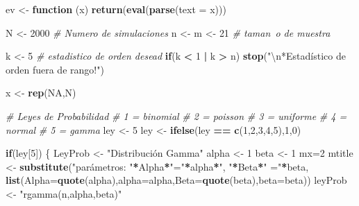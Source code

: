 \documentclass[]{book}
\newenvironment{Shaded}{\begin{snugshade}}{\end{snugshade}}
\newcommand{\CharTok}[1]{\textcolor[rgb]{0.31,0.60,0.02}{#1}}
\newcommand{\CommentTok}[1]{\textcolor[rgb]{0.56,0.35,0.01}{\textit{#1}}}
\newcommand{\ControlFlowTok}[1]{\textcolor[rgb]{0.13,0.29,0.53}{\textbf{#1}}}
\newcommand{\DataTypeTok}[1]{\textcolor[rgb]{0.13,0.29,0.53}{#1}}
\newcommand{\DecValTok}[1]{\textcolor[rgb]{0.00,0.00,0.81}{#1}}
\newcommand{\KeywordTok}[1]{\textcolor[rgb]{0.13,0.29,0.53}{\textbf{#1}}}
\newcommand{\NormalTok}[1]{#1}
\newcommand{\OperatorTok}[1]{\textcolor[rgb]{0.81,0.36,0.00}{\textbf{#1}}}
\newcommand{\OtherTok}[1]{\textcolor[rgb]{0.56,0.35,0.01}{#1}}
\newcommand{\StringTok}[1]{\textcolor[rgb]{0.31,0.60,0.02}{#1}}
\begin{document}
\begin{Shaded}
\begin{Highlighting}[]
\NormalTok{ev <-}\StringTok{ }\ControlFlowTok{function}\NormalTok{ (x) }\KeywordTok{return}\NormalTok{(}\KeywordTok{eval}\NormalTok{(}\KeywordTok{parse}\NormalTok{(}\DataTypeTok{text =}\NormalTok{ x)))}

\NormalTok{N <-}\StringTok{ }\DecValTok{2000}        \CommentTok{# Numero de simulaciones}
\NormalTok{n <-}\StringTok{ }\NormalTok{m <-}\StringTok{ }\DecValTok{21}    \CommentTok{# taman~o de muestra}

\NormalTok{k <-}\StringTok{ }\DecValTok{5}     \CommentTok{# estadistico de orden desead}
\ControlFlowTok{if}\NormalTok{(k }\OperatorTok{<}\StringTok{ }\DecValTok{1} \OperatorTok{|}\StringTok{ }\NormalTok{k }\OperatorTok{>}\StringTok{ }\NormalTok{n) }\KeywordTok{stop}\NormalTok{(}\StringTok{"}\CharTok{\textbackslash{}n}\StringTok{*Estadístico de orden fuera de rango!"}\NormalTok{)}

\NormalTok{x <-}\StringTok{ }\KeywordTok{rep}\NormalTok{(}\OtherTok{NA}\NormalTok{,N)}

\CommentTok{#   Leyes de Probabilidad}
\CommentTok{# 1 = binomial}
\CommentTok{# 2 = poisson}
\CommentTok{# 3 = uniforme}
\CommentTok{# 4 = normal}
\CommentTok{# 5 = gamma}
\NormalTok{ley <-}\StringTok{ }\DecValTok{5}
\NormalTok{ley <-}\StringTok{ }\KeywordTok{ifelse}\NormalTok{(ley }\OperatorTok{==}\StringTok{ }\KeywordTok{c}\NormalTok{(}\DecValTok{1}\NormalTok{,}\DecValTok{2}\NormalTok{,}\DecValTok{3}\NormalTok{,}\DecValTok{4}\NormalTok{,}\DecValTok{5}\NormalTok{),}\DecValTok{1}\NormalTok{,}\DecValTok{0}\NormalTok{)}

\ControlFlowTok{if}\NormalTok{(ley[}\DecValTok{5}\NormalTok{]) \{}
\NormalTok{LeyProb <-}\StringTok{  "Distribución Gamma"}
\NormalTok{alpha <-}\StringTok{ }\DecValTok{1}  
\NormalTok{beta <-}\StringTok{ }\DecValTok{1}
\NormalTok{mx=}\DecValTok{2}
\NormalTok{mtitle <-}\StringTok{ }\KeywordTok{substitute}\NormalTok{(}\StringTok{"parámetros: "}\OperatorTok{*}\NormalTok{Alpha}\OperatorTok{*}\StringTok{"="}\OperatorTok{*}\NormalTok{alpha}\OperatorTok{*}\StringTok{", "}\OperatorTok{*}\NormalTok{Beta}\OperatorTok{*}\StringTok{" ="}\OperatorTok{*}\NormalTok{beta,}
            \KeywordTok{list}\NormalTok{(}\DataTypeTok{Alpha=}\KeywordTok{quote}\NormalTok{(alpha),}\DataTypeTok{alpha=}\NormalTok{alpha,}\DataTypeTok{Beta=}\KeywordTok{quote}\NormalTok{(beta),}\DataTypeTok{beta=}\NormalTok{beta))}
\NormalTok{leyProb <-}\StringTok{ "rgamma(n,alpha,beta)"}


\end{Highlighting}
\end{Shaded}
\end{document}
